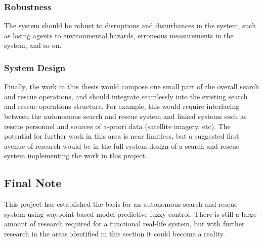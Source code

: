 \documentclass[conference]{IEEEtran}
\begin{document}
\subsubsection{Robustness}

The system should be robust to disruptions and disturbances in the system, such as losing agents to environmental hazards, erroneous measurements in the system, and so on.

\subsubsection{System Design} 
Finally, the work in this thesis would compose one small part of the overall search and rescue operations, and should integrate seamlessly into the existing search and rescue operations structure.
For example, this would require interfacing between the autonomous search and rescue system and linked systems such as rescue personnel and sources of a-priori data (satellite imagery, etc).
The potential for further work in this area is near limitless, but a suggested first avenue of research would be in the full system design of a search and rescue system implementing the work in this project.

\subsection{Final Note}

This project has established the basis for an autonomous search and rescue system using waypoint-based model predictive fuzzy control.
There is still a large amount of research required for a functional real-life system, but with further research in the areas identified in this section it could become a reality.


 

\end{document}
